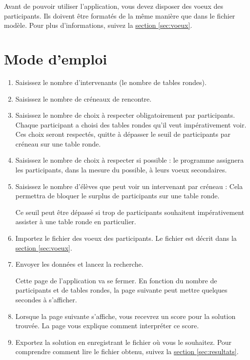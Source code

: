 \documentclass[11pt,a4paper]{article}
\begin{document}
\begin{astuce}
Avant de pouvoir utiliser l'application, vous devez disposer des voeux des participants. Ils doivent être formatés de la même manière que dans le fichier modèle. Pour plus d'informations, suivez la \hyperref[sec:voeux]{section \ref{sec:voeux}}.
\end{astuce}

\section{Mode d'emploi}
\label{sec:emploi}
\begin{enumerate}
  \item Saisissez le nombre d'intervenants (le nombre de tables rondes).
  \item Saisissez le nombre de créneaux de rencontre.
  \item Saisissez le nombre de choix à respecter obligatoirement par participants. Chaque participant a choisi des tables rondes qu'il veut impérativement voir. Ces choix seront respectés, quitte à dépasser le seuil de participants par créneau sur une table ronde.
  \item Saisissez le nombre de choix à respecter si possible : le programme assignera les participants, dans la mesure du possible, à leurs voeux secondaires.
  \item Saisissez le nombre d'élèves que peut voir un intervenant par créneau : Cela permettra de bloquer le surplus de participants sur une table ronde. \begin{attention} Ce seuil peut être dépassé si trop de participants souhaitent impérativement assister à une table ronde en particulier. \end{attention}
  \item Importez le fichier des voeux des participants. Le fichier est décrit dans la \hyperref[sec:voeux]{section \ref{sec:voeux}}.
  \item Envoyer les données et lancez la recherche. \begin{note}Cette page de l'application va se fermer. En fonction du nombre de participants et de tables rondes, la page suivante peut mettre quelques secondes à s'afficher.\end{note}
  \item Lorsque la page suivante s'affiche, vous recevrez un score pour la solution trouvée. La page vous explique comment interpréter ce score.
  \item Exportez la solution en enregistrant le fichier où vous le souhaitez. Pour comprendre comment lire le fichier obtenu, suivez la \hyperref[sec:resultats]{section \ref{sec:resultats}}.
\end{enumerate}
\end{document}
